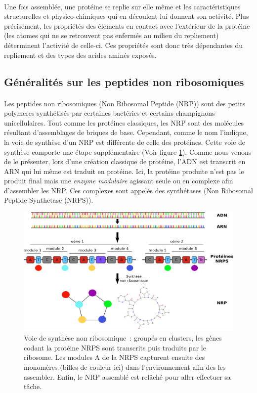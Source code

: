 \documentclass[12pt,french,twoside]{report}
\begin{document}
\paragraph{}Une fois assemblée, une protéine se replie sur elle même et les caractéristiques structurelles et physico-chimiques qui en découlent lui donnent son activité.
Plus précisément, les propriétés des éléments en contact avec l'extérieur de la protéine (les atomes qui ne se retrouvent pas enfermés au milieu du repliement) déterminent l'activité de celle-ci.
Ces propriétés sont donc très dépendantes du repliement et des types des acides aminés exposés.



\subsection{Généralités sur les peptides non ribosomiques}
\paragraph{}Les peptides non ribosomiques (Non Ribosomal Peptide (NRP)) sont des petits polymères synthétisés par certaines bactéries et certains champignons unicellulaires.
Tout comme les protéines classiques, les NRP sont des molécules résultant d'assemblages de briques de base.
Cependant, comme le nom l'indique, la voie de synthèse d'un NRP est différente de celle des protéines.
Cette voie de synthèse comporte une étape supplémentaire (Voir figure \ref{global}).
Comme nous venons de le présenter, lors d'une création classique de protéine, l'ADN est transcrit en ARN qui lui même est traduit en protéine.
Ici, la protéine produite n'est pas le produit final mais une \textit{enzyme modulaire} agissant seule ou en complexe afin d'assembler les NRP.
Ces complexes sont appelés des synthétases (Non Ribosomal Peptide Synthetase (NRPS)).

\begin{figure}[h!]
  \begin{center}
    \includegraphics[width=450px]{Figures/bio/Intro/synthese.png}
    \caption{\label{global}Voie de synthèse non ribosomique~:
    groupés en clusters, les gènes codant la protéine NRPS sont transcrits puis traduits par le ribosome.
    Les modules A de la NRPS capturent ensuite des monomères (billes de couleur ici) dans l'environnement afin des les assembler.
    Enfin, le NRP assemblé est relâché pour aller effectuer sa tâche.
    }
  \end{center}
\end{figure}
\end{document}
